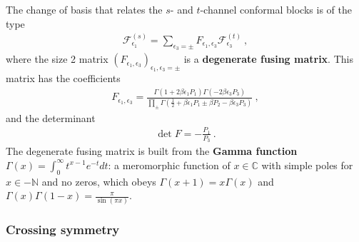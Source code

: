 \documentclass[12pt, a4paper]{article}
\newcommand{\myindex}[1]{\textbf{\boldmath #1}}
\begin{document}
The change of basis that relates the $s$- and $t$-channel conformal blocks is of the type
\begin{align}
 \mathcal{F}^{(s)}_{\epsilon_1} = \sum_{\epsilon_3=\pm} F_{\epsilon_1,\epsilon_3} \mathcal{F}^{(t)}_{\epsilon_3}\ ,
 \label{fsfft}
\end{align}
where the size 2 matrix $\left(F_{\epsilon_1,\epsilon_3}\right)_{\epsilon_1,\epsilon_3=\pm}$ is a \myindex{degenerate fusing matrix}. This matrix has the coefficients
\begin{align}
 \boxed{F_{\epsilon_1,\epsilon_3} = \frac{\Gamma(1+2\beta\epsilon_1P_1)\Gamma(-2\beta \epsilon_3P_3)}{\prod_\pm \Gamma(\frac12 +\beta \epsilon_1P_1 \pm \beta P_2 -\beta \epsilon_3P_3)}}\ ,
 \label{fee}
\end{align}
and the determinant 
\begin{align}
 \det F = -\frac{P_1}{P_3}\ .
 \label{detf}
\end{align}
The degenerate fusing matrix is built from the \myindex{Gamma function} $\Gamma(x)=\int_0^\infty t^{x-1}e^{-t}dt$: a meromorphic function of $x\in\mathbb{C}$ with simple poles for $x\in -\mathbb{N}$ and no zeros, which obeys $\Gamma(x+1)=x\Gamma(x)$ and $\Gamma(x)\Gamma(1-x)=\frac{\pi}{\sin(\pi x)}$.

\subsubsection{Crossing symmetry}
\end{document}
